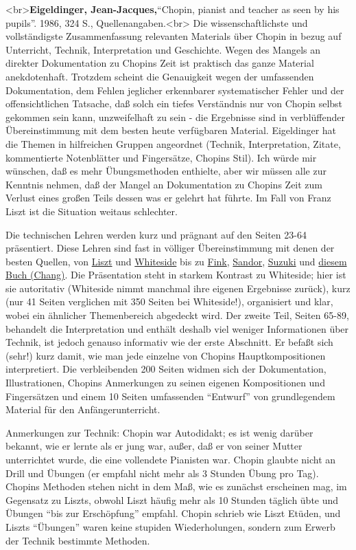 \label{Eigeldinger}

<br>\textbf{Eigeldinger, Jean-Jacques,}\enquote{Chopin, pianist and teacher as seen by his pupils}. 1986, 324 S., Quellenangaben.<br>
Die wissenschaftlichste und vollständigste Zusammenfassung relevanten Materials über Chopin in bezug auf Unterricht, Technik, Interpretation und Geschichte.
Wegen des Mangels an direkter Dokumentation zu Chopins Zeit ist praktisch das ganze Material anekdotenhaft.
Trotzdem scheint die Genauigkeit wegen der umfassenden Dokumentation, dem Fehlen jeglicher erkennbarer systematischer Fehler und der offensichtlichen Tatsache, daß solch ein tiefes Verständnis nur von Chopin selbst gekommen sein kann, unzweifelhaft zu sein - die Ergebnisse sind in verblüffender Übereinstimmung mit dem besten heute verfügbaren Material.
Eigeldinger hat die Themen in hilfreichen Gruppen angeordnet (Technik, Interpretation, Zitate, kommentierte Notenblätter und Fingersätze, Chopins Stil).
Ich würde mir wünschen, daß es mehr Übungsmethoden enthielte, aber wir müssen alle zur Kenntnis nehmen, daß der Mangel an Dokumentation zu Chopins Zeit zum Verlust eines großen Teils dessen was er gelehrt hat führte.
Im Fall von Franz Liszt ist die Situation weitaus schlechter.

Die technischen Lehren werden kurz und prägnant auf den Seiten 23-64 präsentiert.
Diese Lehren sind fast in völliger Übereinstimmung mit denen der besten Quellen, von \hyperref[Walker]{Liszt} und \hyperref[Whiteside]{Whiteside} bis zu \hyperref[Fink]{Fink}, \hyperref[Sandor]{Sandor}, \hyperref[Suzuki]{Suzuki} und \hyperref[Chang]{diesem Buch (Chang)}.
Die Präsentation steht in starkem Kontrast zu Whiteside; hier ist sie autoritativ (Whiteside nimmt manchmal ihre eigenen Ergebnisse zurück), kurz (nur 41 Seiten verglichen mit 350 Seiten bei Whiteside!), organisiert und klar, wobei ein ähnlicher Themenbereich abgedeckt wird.
Der zweite Teil, Seiten 65-89, behandelt die Interpretation und enthält deshalb viel weniger Informationen über Technik, ist jedoch genauso informativ wie der erste Abschnitt.
Er befaßt sich (sehr!) kurz damit, wie man jede einzelne von Chopins Hauptkompositionen interpretiert.
Die verbleibenden 200 Seiten widmen sich der Dokumentation, Illustrationen, Chopins Anmerkungen zu seinen eigenen Kompositionen und Fingersätzen und einem 10 Seiten umfassenden \enquote{Entwurf} von grundlegendem Material für den Anfängerunterricht.

Anmerkungen zur Technik: Chopin war Autodidakt; es ist wenig darüber bekannt, wie er lernte als er jung war, außer, daß er von seiner Mutter unterrichtet wurde, die eine vollendete Pianisten war.
Chopin glaubte nicht an Drill und Übungen (er empfahl nicht mehr als 3 Stunden Übung pro Tag).
Chopins Methoden stehen nicht in dem Maß, wie es zunächst erscheinen mag, im Gegensatz zu Liszts, obwohl Liszt häufig mehr als 10 Stunden täglich übte und Übungen \enquote{bis zur Erschöpfung} empfahl.
Chopin schrieb wie Liszt Etüden, und Liszts \enquote{Übungen} waren keine stupiden Wiederholungen, sondern zum Erwerb der Technik bestimmte Methoden.

